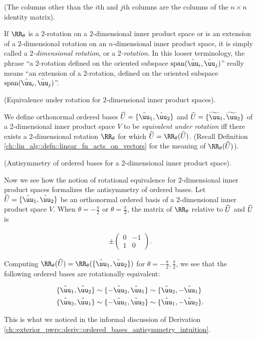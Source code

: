 \begin{defn}
    (The columns other than the $i$th and $j$th columns are the columns of the $n \times n$ identity matrix).
    
    If $\RR_\theta$ is a $2$-rotation on a $2$-dimensional inner product space or is an extension of a $2$-dimensional  rotation on an $n$-dimensional inner product space, it is simply called a \textit{$2$-dimensional  rotation}, or a \textit{$2$-rotation}. In this looser terminology, the phrase ``a $2$-rotation defined on the oriented subspace $\spann(\huu_i, \huu_j)$'' really means ``an extension of a $2$-rotation, defined on the oriented subspace $\spann(\huu_i, \huu_j)$''.
\end{defn}

\begin{defn}
    (Equivalence under rotation for $2$-dimensional inner product spaces).
    
    We define orthonormal ordered bases $\hU = \{\huu_1, \huu_2\}$ and $\tU = \{\tuu_1, \tuu_2\}$ of a 2-dimensional inner product space $V$ to be \textit{equivalent under rotation} iff there exists a $2$-dimensional  rotation $\RR_\theta$ for which $\tU = \RR_\theta(\hU)$. (Recall Definition \ref{ch::lin_alg::defn::linear_fn_acts_on_vectors} for the meaning of $\RR_\theta(\hU)$).
\end{defn}

\begin{theorem}
    (Antisymmetry of ordered bases for a $2$-dimensional inner product space).
    
    Now we see how the notion of rotational equivalence for $2$-dimensional inner product spaces formalizes the antisymmetry of ordered bases. Let $\hU = \{\huu_1, \huu_2\}$ be an orthonormal ordered basis of a $2$-dimensional inner product space $V$. When $\theta = -\frac{\pi}{2}$ or $\theta = \frac{\pi}{2}$, the matrix of $\RR_\theta$ relative to $\widehat{U}$ and $\widehat{U}$ is
    
    \begin{align*}
        \pm
        \begin{pmatrix}
            0 & -1 \\
            1 & 0
        \end{pmatrix}.
    \end{align*}
    
    Computing $\RR_\theta(\hU) = \RR_\theta(\{\huu_1, \huu_2\})$ for $\theta = -\frac{\pi}{2}, \frac{\pi}{2}$, we see that the following ordered bases are rotationally equivalent:
    
    \begin{align*}
        \{\huu_1, \huu_2\} &\sim \{-\huu_2, \huu_1\} \sim \{\huu_2, -\huu_1\} \\
        \{\huu_2, \huu_1 \} &\sim \{-\huu_1, \huu_2\} \sim \{\huu_1, - \huu_2\}.
    \end{align*}

    This is what we noticed in the informal discussion of Derivation \ref{ch::exterior_pwrs::deriv::ordered_bases_antisymmetry_intuition}.
\end{theorem}

